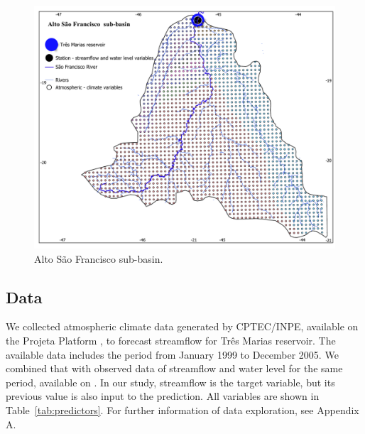 \documentclass[12pt]{article}
\begin{document}
\begin{figure}[htbp]
  \centering
  \includegraphics[width=0.9\linewidth]{Figures/mapa.pdf}
  \caption{Alto São Francisco sub-basin.}
  \label{fig:studyarea}
\end{figure}

\subsection{Data}

We collected atmospheric climate data generated by CPTEC/INPE, available on the Projeta Platform \cite{chou2014assessment,chou2014evaluation,Lyra2018}, to forecast streamflow for Três Marias reservoir. The available data includes the period from January 1999 to December 2005. We combined that with observed data of streamflow and water level for the same period, available on \cite{onsnivel,onsvazao}. In our study, streamflow is the target variable, but its previous value is also input to the prediction. All variables are shown in Table~\ref{tab:predictors}. For further information of data exploration, see Appendix A.
\end{document}
